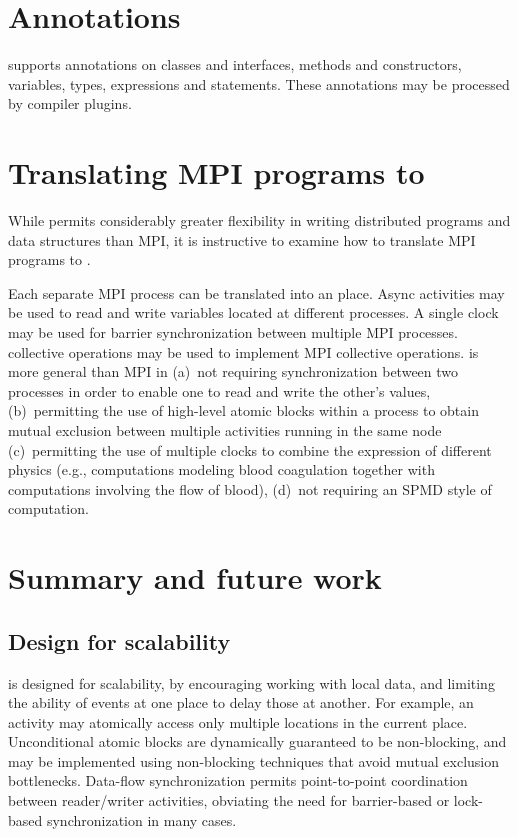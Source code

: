 \section{Annotations}

\Xten{} supports annotations on classes and interfaces, methods
and constructors,
variables, types, expressions and statements.
These annotations may be processed by compiler plugins.

\section{Translating MPI programs to \Xten{}}

While \Xten{} permits considerably greater flexibility in writing
distributed programs and data structures than MPI, it is instructive
to examine how to translate MPI programs to \Xten.

Each separate MPI process can be translated into an \Xten{}
place. Async activities may be used to read and write variables
located at different processes. A single clock may be used for barrier
synchronization between multiple MPI processes. \Xten{} collective
operations may be used to implement MPI collective operations.
\Xten{} is more general than MPI in (a)~not requiring synchronization
between two processes in order to enable one to read and write the
other's values, (b)~permitting the use of high-level atomic blocks
within a process to obtain mutual exclusion between multiple
activities running in the same node (c)~permitting the use of multiple
clocks to combine the expression of different physics (e.g.,
computations modeling blood coagulation together with computations
involving the flow of blood), (d)~not requiring an SPMD style of
computation.


\section{Summary and future work}
\subsection{Design for scalability}
\Xten{} is designed for scalability, by encouraging working with local data,
and limiting the ability of events at one place to delay those at another. For
example, an activity may atomically access only multiple locations in the
current place. Unconditional atomic blocks are dynamically guaranteed to be
non-blocking, and may be implemented using non-blocking techniques that avoid
mutual exclusion bottlenecks. 
Data-flow synchronization permits point-to-point
coordination between reader/writer activities, obviating the need for
barrier-based or lock-based synchronization in many cases.

